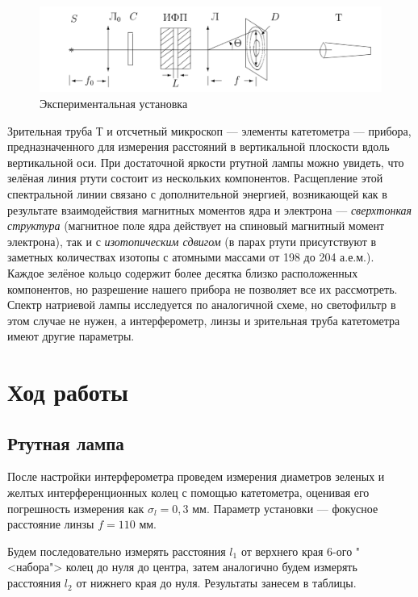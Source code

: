 \documentclass[12pt]{kiarticle}
\begin{document}
		\begin{figure}[h!]
		\centering
		\includegraphics[width=\linewidth]{lab.png}
		\caption{Экспериментальная установка}
		\label{lab}
	\end{figure}

	
	Зрительная труба $ Т $ и отсчетный микроскоп  --- элементы катетометра --- прибора, предназначенного для измерения расстояний в вертикальной плоскости вдоль вертикальной оси. 
	При достаточной яркости ртутной лампы можно увидеть, что зелёная линия
	ртути состоит из нескольких компонентов. Расщепление этой спектральной линии связано с дополнительной энергией, возникающей как в результате взаимодействия магнитных моментов ядра и электрона --- \textit{сверхтонкая структура} (магнитное поле ядра действует на спиновый магнитный момент электрона), так и с \textit{изотопическим сдвигом} (в парах ртути присутствуют в заметных количествах изотопы с атомными массами от 198 до 204 а.е.м.). Каждое зелёное кольцо содержит более десятка близко расположенных компонентов, но разрешение нашего прибора не позволяет все их рассмотреть.
	Спектр натриевой лампы исследуется по аналогичной схеме, но светофильтр в этом случае не нужен, а интерферометр, линзы и зрительная труба катетометра
	имеют другие параметры.
	
		\section{Ход работы}
		
		\subsection{Ртутная лампа}
		
		После настройки интерферометра проведем измерения диаметров зеленых и желтых интерференционных колец с помощью катетометра, оценивая его погрешность измерения как $ \sigma_l = 0,3 $ мм. Параметр установки --- фокусное расстояние линзы $ f = 110 $ мм.
		
		Будем последовательно измерять расстояния $ l_1 $ от верхнего края 6-ого "<набора"> колец до нуля до центра, затем аналогично будем измерять расстояния $ l_2 $ от нижнего края до нуля. Результаты занесем в таблицы. 
		
\end{document}
